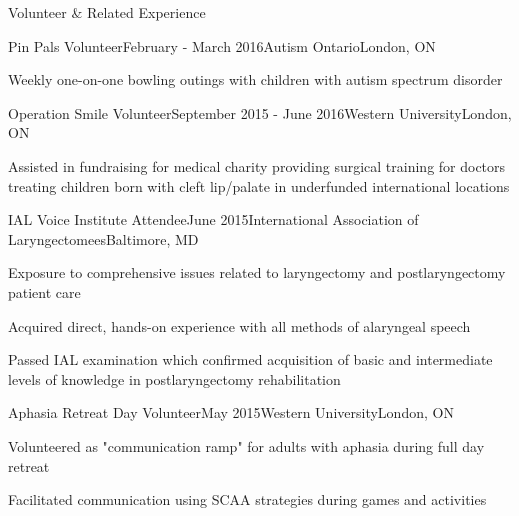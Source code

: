 \documentclass{resume} %
\begin{document}
\begin{rSection}{Volunteer \& Related Experience}


	\begin{rSubsection}{Pin Pals Volunteer}{February - March 2016}{Autism Ontario}{London, ON}
	\item Weekly one-on-one bowling outings with children with autism spectrum disorder
	
	\end{rSubsection}
	
	
	\begin{rSubsection}{Operation Smile Volunteer}{September 2015 - June 2016}{Western University}{London, ON}
	\item Assisted in fundraising for medical charity providing surgical training for doctors treating children born with cleft lip/palate in underfunded international locations
	
	\end{rSubsection}
	
	
	\begin{rSubsection}{IAL Voice Institute Attendee}{June 2015}{International Association of Laryngectomees}{Baltimore, MD}
	\item Exposure to comprehensive issues related to laryngectomy and postlaryngectomy patient care
	\item Acquired direct, hands-on experience with all methods of alaryngeal speech %
	\item Passed IAL examination which confirmed acquisition of basic and intermediate levels of knowledge in postlaryngectomy rehabilitation
	
	\end{rSubsection}
	

	
	\begin{rSubsection}{Aphasia Retreat Day Volunteer}{May 2015}{Western University}{London, ON}
	\item Volunteered as "communication ramp" for adults with aphasia during full day retreat
	\item Facilitated communication using SCAA strategies during games and activities 
	

\end{rSubsection}
\end{rSection}
\end{document}
